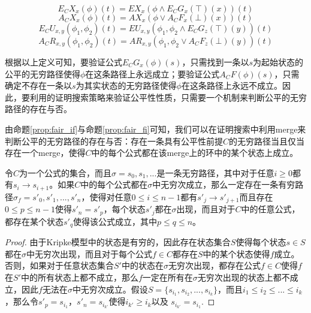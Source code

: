 \begin{small}
	$$E_CX_x(\phi)(t) = EX_x(\phi \wedge E_CG_x(\top)(x))(t)$$
	$$A_CX_x(\phi)(t) = AX_x(\phi \vee A_CF_x(\bot)(x))(t)$$
	$$E_CU_{x,y}(\phi_1,\phi_2)(t) = EU_{x,y}(\phi_1, \phi_2\wedge E_CG_z(\top)(y))(t)$$
	$$A_CR_{x,y}(\phi_1,\phi_2)(t) = AR_{x,y}(\phi_1, \phi_2\vee A_CF_z(\bot)(y))(t)$$
\end{small}

根据以上定义可知，要验证公式$E_CG_x(\phi)(s)$，只需找到一条以$s$为起始状态的公平的无穷路径使得$\phi$在这条路径上永远成立；要验证公式$A_CF(\phi)(s)$，只需确定不存在一条以$s$为其实状态的无穷路径使得$\phi$在这条路径上永远不成立。因此，要利用\SCTL{}的证明搜索策略来验证公平性性质，只需要一个机制来判断公平的无穷路径的存在与否。

由命题\ref{prop:fair_if}与命题\ref{prop:fair_fi}可知，我们可以在证明搜索中利用merge来判断公平的无穷路径的存在与否：存在一条具有公平性前提$C$的无穷路径当且仅当存在一个merge，使得$C$中的每个公式都在该merge上的环中的某个状态上成立。



\begin{proposition}\label{prop:fair_if}
	令$C$为一个\CTLP{}公式的集合，而且$\sigma = s_0,s_1,...$是一条无穷路径，其中对于任意$i\ge 0$都有$s_i \rightarrow s_{i+1}$。如果$C$中的每个公式都在$\sigma$中无穷次成立，那么一定存在一条有穷路径$\sigma_f = s'_0,s'_1,...,s'_n$，使得对任意$0\le i\le n-1$都有$s'_j\rightarrow s'_{j+1}$而且存在$0\le p\le n-1$使得$s'_n = s'_p$，每个状态$s'_j$都在$\sigma$出现，而且对于$C$中的任意公式，都存在某个状态$s'_q$使得该公式成立，其中$p\le q\le n$。
\end{proposition}
\begin{proof}
	由于Kripke模型中的状态是有穷的，因此存在状态集合$S$使得每个状态$s\in S$都在$\sigma$中无穷次出现，而且对于每个公式$f\in C$都存在$S$中的某个状态使得$f$成立。否则，如果对于任意状态集合$S'$中的状态在$\sigma$无穷次出现，都存在公式$f\in C$使得$f$在$S'$中的所有状态上都不成立，那么$f$一定在所有在$\sigma$无穷次出现的状态上都不成立，因此$f$无法在$\sigma$中无穷次成立。假设$S = \{s_{i_1},s_{i_2},...,s_{i_k}\}$，而且$i_1\le i_2\le ...\le i_k$，那么令$s'_p = s_{i_1}$，$s'_n = s_{i_{k'}}$使得$i_{k'} \ge i_k$以及 $s_{i_{k'}} = s_{i_1}$.
\end{proof}

